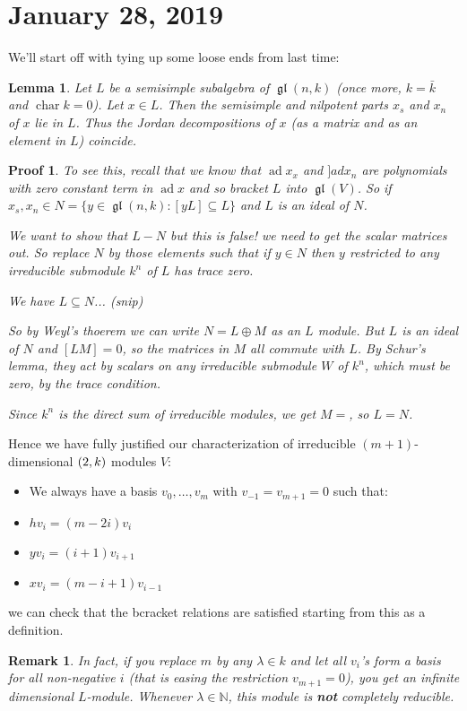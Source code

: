 \documentclass[12pt]{article}
\theoremstyle{nonumberbreak}
\theoremstyle{changebreak}
\newtheorem{lem}[thm]{Lemma}
\theoremstyle{nonumberbreak}
\newtheorem{prf}{Proof}
\theoremstyle{change}
\newtheorem{rmk}[thm]{Remark}
\newcommand*{\N}{
\mathbb{N}
}
\DeclareMathOperator{\ch}{char}
\DeclareMathOperator{\gl}{\mathfrak{gl}}
\let\sl\relax
\DeclareMathOperator{\sl}{\mathfrak{sl}}
\DeclareMathOperator{\ad}{ad}
\begin{document}
\section{January 28, 2019}
We'll start off with tying up some loose ends from last time: 
\begin{lem}
	Let $L$ be a semisimple subalgebra of $\gl(n,k)$ (once more, $k=\bar k$ and $\ch k=0$). Let $x\in L$. Then 
	the semisimple and nilpotent parts $x_s$ and $x_n$ of $x$ lie in $L$. Thus the Jordan decompositions of $x$ 
	(as a matrix and as an element in $L$) coincide.
\end{lem}
\begin{prf}
	To see this, recall that we know that $\ad x_x$ and $]ad x_n$ are polynomials with zero constant term in $\ad x$ and
	so bracket $L$ into $\gl(V)$. So if $x_s,x_n\in N=\{y\in\gl(n,k):[yL]\subseteq L\}$ and $L$ is an ideal of $N$.

	We want to show that $L-N$ but this is false! we need to get the scalar matrices out. So replace $N$ by those elements 
	such that if $y\in N$ then $y$ restricted to any irreducible submodule $k^n$ of $L$ has trace zero.

	We have $L\subseteq N$... (snip)

	So by Weyl's thoerem we can write $N=L\oplus M$ as an $L$ module. But $L$ is an ideal of $N$ and $[LM]=0$, so the matrices in $M$
	all commute with $L$. By Schur's lemma, they act by scalars on any irreducible submodule $W$ of $k^n$, which must be zero, by the trace condition.

	Since $k^n$ is the direct sum of irreducible modules, we get $M=$, so $L=N$.
\end{prf}

Hence we have fully justified our characterization of irreducible $(m+1)$-dimensional $\sl(2,k)$ modules $V$:
\begin{itemize}
	\item We always have a basis $v_0,\dots,v_m$ with $v_{-1}=v_{m+1}=0$ such that:
	\item $hv_i=(m-2i)v_i$
	\item $yv_i=(i+1)v_{i+1}$
	\item $xv_i=(m-i+1)v_{i-1}$
\end{itemize}
we can check that the bcracket relations are satisfied starting from this as a definition.
\begin{rmk}
	In fact, if you replace $m$ by any $\lambda\in k$ and let all $v_i$'s form a basis for all non-negative $i$ (that is easing
	the restriction $v_{m+1}=0$), you get an infinite dimensional $L$-module. Whenever $\lambda\in\N$, this module is \textbf{not}
	completely reducible.
\end{rmk}
\end{document}
